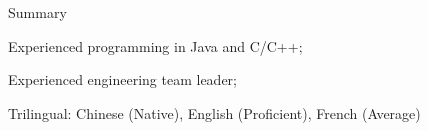 \documentclass{resume} %
\begin{document}
\begin{rSection}{Summary}

\item Experienced programming in Java and C/C++;
\item Experienced engineering team leader;
\item Trilingual: Chinese (Native), English (Proficient), French (Average)

\end{rSection}





\end{document}
